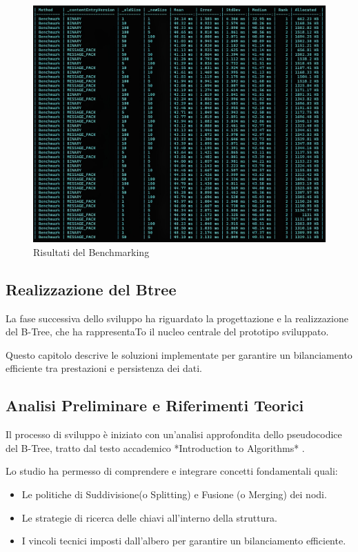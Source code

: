 \documentclass[12pt,a4paper,openright,twoside]{book}
\begin{document}
            \begin{figure} [h]
                \centering
                \includegraphics[width=1\linewidth]{figures/BenchmarkS-D.jpeg}
                \caption{Risultati del Benchmarking}
                \label{fig:serialization}
            \end{figure}

        \clearpage

        \subsection{Realizzazione del Btree}

            La fase successiva dello sviluppo ha riguardato la progettazione e la realizzazione del B-Tree, che ha rappresentaTo il nucleo centrale del prototipo sviluppato.

            Questo capitolo descrive le soluzioni implementate per garantire un bilanciamento efficiente tra prestazioni e persistenza dei dati.

            \subsection{Analisi Preliminare e Riferimenti Teorici}
                Il processo di sviluppo è iniziato con un'analisi approfondita dello pseudocodice del B-Tree, tratto dal testo accademico *Introduction to Algorithms* \cite{cormen2009introduction}.

                Lo studio ha permesso di comprendere e integrare concetti fondamentali quali:
                \begin{itemize}
                    \item Le politiche di Suddivisione(o Splitting) e Fusione (o Merging) dei nodi.
                    \item Le strategie di ricerca delle chiavi all'interno della struttura.
                    \item I vincoli tecnici imposti dall'albero per garantire un bilanciamento efficiente.
                \end{itemize}
\end{document}
